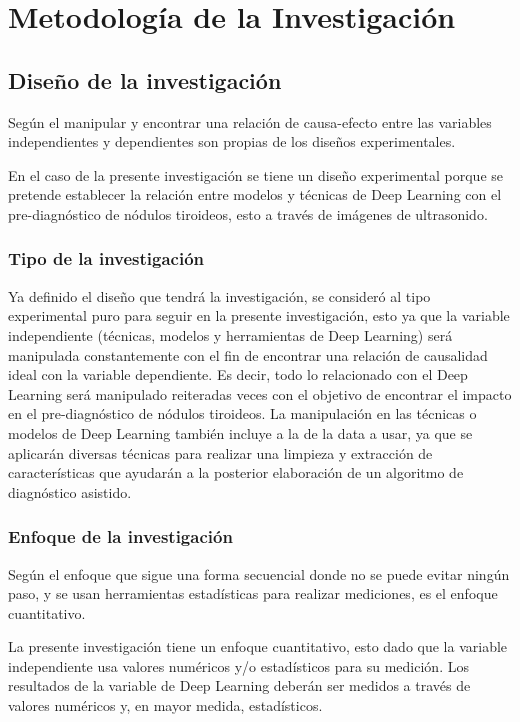 \chapter{Metodología de la Investigación}
\section{Diseño de la investigación}
Según \cite{bk_sampieri2014metodologia} el manipular y encontrar una relación de causa-efecto entre las variables independientes y dependientes son propias de los diseños experimentales.

En el caso de la presente investigación se tiene un diseño experimental porque se pretende establecer la relación entre modelos y técnicas de Deep Learning con el pre-diagnóstico de nódulos tiroideos, esto a través de imágenes de ultrasonido. 

\subsection{Tipo de la investigación}
Ya definido el diseño que tendrá la investigación, se consideró al tipo experimental puro para seguir en la presente investigación, esto ya que la variable independiente (técnicas, modelos y herramientas de Deep Learning) será manipulada constantemente con el fin de encontrar una relación de causalidad ideal con la variable dependiente. Es decir, todo lo relacionado con el Deep Learning será manipulado reiteradas veces con el objetivo de encontrar el impacto en el pre-diagnóstico de nódulos tiroideos. La manipulación en las técnicas o modelos de Deep Learning también incluye a la de la data a usar, ya que se aplicarán diversas técnicas para realizar una limpieza y extracción de características que ayudarán a la posterior elaboración de un algoritmo de diagnóstico asistido.

\subsection{Enfoque de la investigación}
Según \cite{bk_sampieri2014metodologia} el enfoque que sigue una forma secuencial donde no se puede evitar ningún paso, y se usan herramientas estadísticas para realizar mediciones, es el enfoque cuantitativo. 

La presente investigación tiene un enfoque cuantitativo, esto dado que la variable independiente usa valores numéricos y/o estadísticos para su medición. Los resultados de la variable de Deep Learning deberán ser medidos a través de valores numéricos y, en mayor medida, estadísticos.

